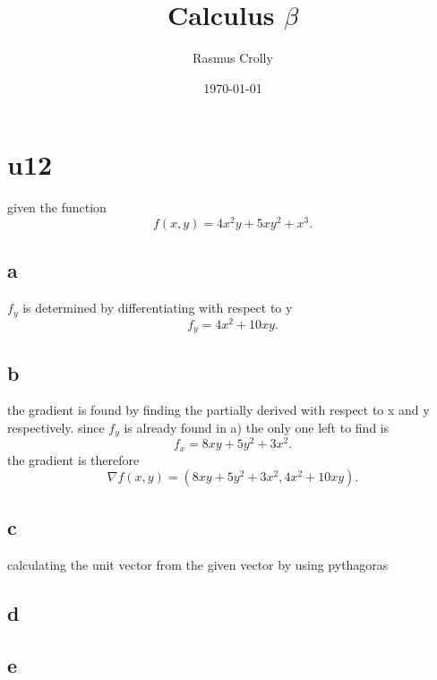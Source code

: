 \documentclass[12pt,a4paper]{article}
\title{Calculus $\beta$}
\author{Rasmus Crolly}
\date{\today}
\begin{document}
\maketitle
	
\section{u12}

given the function \[
	f\left( x,y \right) = 4x^2y+5xy^2+x^3
.\] 

\subsection{a}


$f_{y}$ is determined by differentiating with respect to y \[
f_{y}=4x^2+10xy
.\] 

\subsection{b}
the gradient is found by finding the partially derived with respect to x and y respectively. since $f_{y}$ is already found in a) the only one left to find is \[
f_{x}=8xy+5y^2+3x^2
.\] 
the gradient is therefore \[
\nabla f(x,y) = (8xy+5y^2+3x^2,4x^2+10xy) 
.\] 



\subsection{c}
calculating the unit vector from the given vector by using pythagoras






\subsection{d}



\subsection{e}
\end{document}
